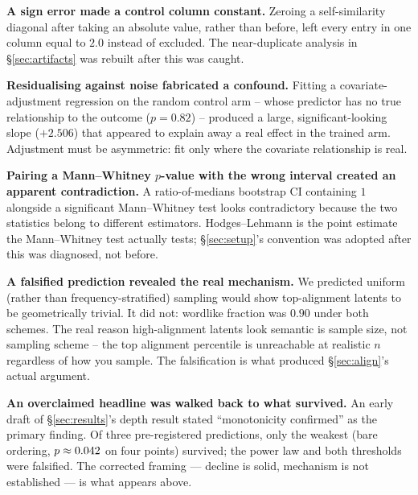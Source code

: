 \documentclass[11pt]{article}
\begin{document}
\textbf{A sign error made a control column constant.} Zeroing a self-similarity
diagonal after taking an absolute value, rather than before, left every entry
in one column equal to $2.0$ instead of excluded. The near-duplicate analysis
in \S\ref{sec:artifacts} was rebuilt after this was caught.

\textbf{Residualising against noise fabricated a confound.} Fitting a
covariate-adjustment regression on the random control arm -- whose predictor
has no true relationship to the outcome ($p=0.82$) -- produced a large,
significant-looking slope ($+2.506$) that appeared to explain away a real
effect in the trained arm. Adjustment must be asymmetric: fit only where the
covariate relationship is real.

\textbf{Pairing a Mann--Whitney $p$-value with the wrong interval created an
apparent contradiction.} A ratio-of-medians bootstrap CI containing $1$
alongside a significant Mann--Whitney test looks contradictory because the two
statistics belong to different estimators. Hodges--Lehmann is the point
estimate the Mann--Whitney test actually tests; \S\ref{sec:setup}'s convention
was adopted after this was diagnosed, not before.

\textbf{A falsified prediction revealed the real mechanism.} We predicted
uniform (rather than frequency-stratified) sampling would show top-alignment
latents to be geometrically trivial. It did not: wordlike fraction was
$0.90$ under both schemes. The real reason high-alignment latents look
semantic is sample size, not sampling scheme -- the top alignment percentile is
unreachable at realistic $n$ regardless of how you sample. The falsification is
what produced \S\ref{sec:align}'s actual argument.

\textbf{An overclaimed headline was walked back to what survived.} An early
draft of \S\ref{sec:results}'s depth result stated ``monotonicity confirmed'' as
the primary finding. Of three pre-registered predictions, only the weakest
(bare ordering, $p\approx0.042$ on four points) survived; the power law
and both thresholds were falsified. The corrected framing --- decline is solid,
mechanism is not established --- is what appears above.
\end{document}
